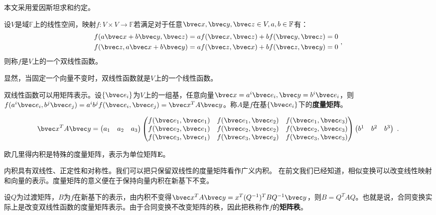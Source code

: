 本文采用爱因斯坦求和约定。

\begin{definition}{}
设$V$是域$\mathbb F$上的线性空间，映射$f:V\times V\rightarrow\mathbb F$若满足对于任意$\bvec x,\bvec y,\bvec z \in V,a,b\in \mathbb F$有：
\begin{equation}
\begin{aligned}
f(a\bvec x+b\bvec y,\bvec z)&=af(\bvec x,\bvec z)+bf(\bvec y,\bvec z)=0\\
f(\bvec z,a\bvec x+b\bvec y)&=af(\bvec z,\bvec  x)+bf(\bvec z,\bvec y)=0
\end{aligned}~,
\end{equation}
则称$f$是$V$上的一个双线性函数。
\end{definition}

显然，当固定一个向量不变时，双线性函数就是$V$上的一个线性函数。

双线性函数可以用矩阵表示。设$\{\bvec e_i\}$为$V$上的一组基，任意向量$\bvec x=a^i\bvec e_i,\bvec y=b^i\bvec e_i$，则$f(a^i\bvec e_i,b^j\bvec e_j)=a^ib^jf(\bvec e_i,\bvec e_j)=\bvec x^TA\bvec y$。称$A$是$f$在基$\{\bvec e_i\}$下的\textbf{度量矩阵}。
\begin{example}{}
\begin{equation}
\bvec x^TA\bvec y=\begin{pmatrix}
 a_1 &a_2  &a_3
\end{pmatrix}
\begin{pmatrix}
  f(\bvec e_1,\bvec e_1)& f(\bvec e_1,\bvec e_2) &f(\bvec e_1,\bvec e_3) \\
 f(\bvec e_2,\bvec e_1) &f(\bvec e_2,\bvec e_2)  &f(\bvec e_2,\bvec e_3) \\
 f(\bvec e_3,\bvec e_1) & f(\bvec e_3,\bvec e_2) &f(\bvec e_3,\bvec e_3)
\end{pmatrix}
 \begin{pmatrix}
 b^1 &b^2  &b^3
\end{pmatrix}~.
\end{equation}
\end{example}
\begin{example}{}
欧几里得内积是特殊的度量矩阵，表示为单位矩阵$\boldsymbol E$。
\end{example}
内积具有双线性、正定性和对称性。我们可以把只保留双线性的度量矩阵看作广义内积。
在前文我们已经知道，相似变换可以改变线性映射和向量的表示。度量矩阵的意义便在于保持向量内积在新基下不变。

设$Q$为过渡矩阵，$B$为$f$在新基下的表示，由内积不变得$\bvec x^TA\bvec y=x^T(Q^{-1})^TBQ^{-1}\bvec y$，则$B=Q^{T}AQ$。也就是说，合同变换实际上是改变双线性函数的度量矩阵表示。由于合同变换不改变矩阵的秩，因此把秩称作$f$的\textbf{矩阵秩}。

